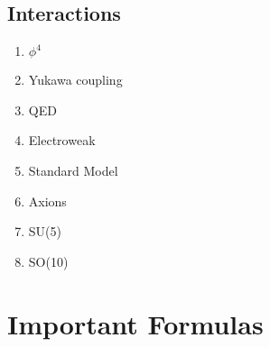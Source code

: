 \section{Interactions}
\begin{enumerate}
  \item $\phi^4$
  \item Yukawa coupling
  \item QED
  \item Electroweak
  \item Standard Model
  \item Axions
  \item SU(5)
  \item SO(10)
\end{enumerate}


\chapter{Important Formulas}



\label{app:noether}